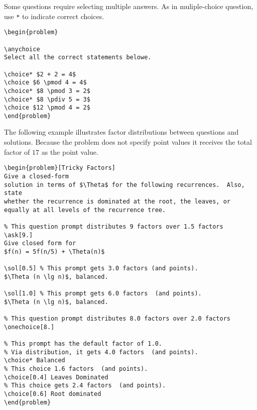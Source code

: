 \begin{example}

Some questions require selecting multiple answers.
As in muliple-choice question, use \lstinline`*` to indicate correct choices.

\begin{lstlisting}
\begin{problem}

\anychoice
Select all the correct statements belowe.

\choice* $2 + 2 = 4$
\choice $6 \pmod 4 = 4$
\choice* $8 \pmod 3 = 2$
\choice* $8 \pdiv 5 = 3$
\choice $12 \pmod 4 = 2$
\end{problem}
\end{lstlisting}
\end{example}

\begin{example}
The following example illustrates factor distributions between
questions and solutions.  Because the problem does not specify point
values it receives the total factor of $17$ as the point value.
\begin{lstlisting}
\begin{problem}[Tricky Factors]
Give a closed-form
solution in terms of $\Theta$ for the following recurrences.  Also, state
whether the recurrence is dominated at the root, the leaves, or
equally at all levels of the recurrence tree.

% This question prompt distributes 9 factors over 1.5 factors
\ask[9.]
Give closed form for  
$f(n) = 5f(n/5) + \Theta(n)$

\sol[0.5] % This prompt gets 3.0 factors (and points).
$\Theta (n \lg n)$, balanced.

\sol[1.0] % This prompt gets 6.0 factors  (and points).
$\Theta (n \lg n)$, balanced.

% This question prompt distributes 8.0 factors over 2.0 factors 
\onechoice[8.] 

% This prompt has the default factor of 1.0.
% Via distribution, it gets 4.0 factors  (and points). 
\choice* Balanced 
% This choice 1.6 factors  (and points).
\choice[0.4] Leaves Dominated  
% This choice gets 2.4 factors  (and points).
\choice[0.6] Root dominated   
\end{problem}
\end{lstlisting}
\end{example}


